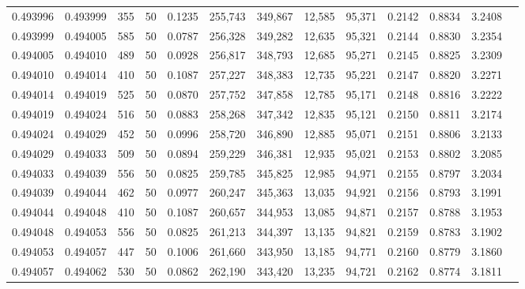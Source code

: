 \begin{tabular}{rrrrrrrrrrrrr}
0.493996 & 0.493999 &   355 &  50 &                                     0.1235 & 255,743 & 349,867 &  12,585 &  95,371 & 0.2142 & 0.8834 & 3.2408 \\
0.493999 & 0.494005 &   585 &  50 &                                     0.0787 & 256,328 & 349,282 &  12,635 &  95,321 & 0.2144 & 0.8830 & 3.2354 \\
0.494005 & 0.494010 &   489 &  50 &                                     0.0928 & 256,817 & 348,793 &  12,685 &  95,271 & 0.2145 & 0.8825 & 3.2309 \\
0.494010 & 0.494014 &   410 &  50 &                                     0.1087 & 257,227 & 348,383 &  12,735 &  95,221 & 0.2147 & 0.8820 & 3.2271 \\
0.494014 & 0.494019 &   525 &  50 &                                     0.0870 & 257,752 & 347,858 &  12,785 &  95,171 & 0.2148 & 0.8816 & 3.2222 \\
0.494019 & 0.494024 &   516 &  50 &                                     0.0883 & 258,268 & 347,342 &  12,835 &  95,121 & 0.2150 & 0.8811 & 3.2174 \\
0.494024 & 0.494029 &   452 &  50 &                                     0.0996 & 258,720 & 346,890 &  12,885 &  95,071 & 0.2151 & 0.8806 & 3.2133 \\
0.494029 & 0.494033 &   509 &  50 &                                     0.0894 & 259,229 & 346,381 &  12,935 &  95,021 & 0.2153 & 0.8802 & 3.2085 \\
0.494033 & 0.494039 &   556 &  50 &                                     0.0825 & 259,785 & 345,825 &  12,985 &  94,971 & 0.2155 & 0.8797 & 3.2034 \\
0.494039 & 0.494044 &   462 &  50 &                                     0.0977 & 260,247 & 345,363 &  13,035 &  94,921 & 0.2156 & 0.8793 & 3.1991 \\
0.494044 & 0.494048 &   410 &  50 &                                     0.1087 & 260,657 & 344,953 &  13,085 &  94,871 & 0.2157 & 0.8788 & 3.1953 \\
0.494048 & 0.494053 &   556 &  50 &                                     0.0825 & 261,213 & 344,397 &  13,135 &  94,821 & 0.2159 & 0.8783 & 3.1902 \\
0.494053 & 0.494057 &   447 &  50 &                                     0.1006 & 261,660 & 343,950 &  13,185 &  94,771 & 0.2160 & 0.8779 & 3.1860 \\
0.494057 & 0.494062 &   530 &  50 &                                     0.0862 & 262,190 & 343,420 &  13,235 &  94,721 & 0.2162 & 0.8774 & 3.1811 \\

\end{tabular}
